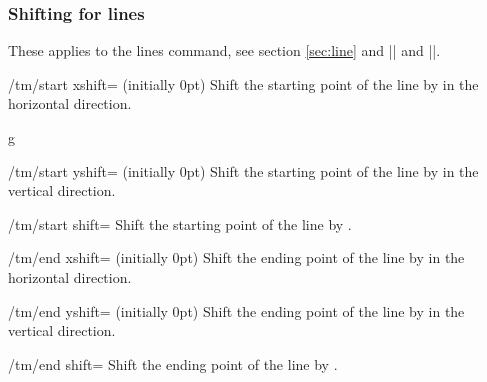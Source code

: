 \subsubsection{Shifting for lines}\label{sec:custom:transformations:lines}
These applies to the lines command, see section \ref{sec:line} and |\tmbrace| and 
|\tmbracket|.
\begin{key}{/tm/start xshift= (initially 0pt)}
  Shift the starting point of the line by  in the horizontal direction.
\end{key}
\begin{codeexample}[]
\begin{tmline}
\begin{tmstaff}{g}{}
\end{tmstaff}
\end{tmline}
\end{codeexample}
\begin{key}{/tm/start yshift= (initially 0pt)}
  Shift the starting point of the line by  in the vertical direction.
\end{key}
\begin{key}{/tm/start shift=}
  Shift the starting point of the line by .
\end{key}
\begin{key}{/tm/end xshift= (initially 0pt)}
  Shift the ending point of the line by  in the horizontal direction.
\end{key}
\begin{key}{/tm/end yshift= (initially 0pt)}
  Shift the ending point of the line by  in the vertical direction.
\end{key}
\begin{key}{/tm/end shift=}
  Shift the ending point of the line by .
\end{key}
